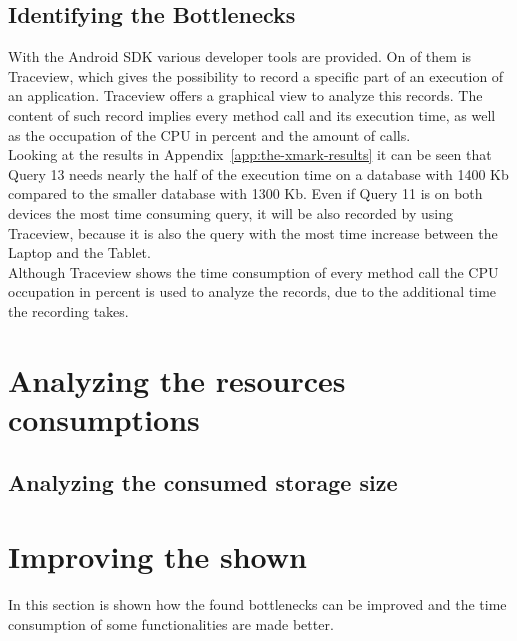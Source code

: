 \subsection{Identifying the Bottlenecks}
\label{sec:identifying-the-bottlenecks}
With the Android SDK various developer tools are provided.
On of them is Traceview, which gives the possibility to record a specific part of an execution of an application.
Traceview offers a graphical view to analyze this records.
The content of such record implies every method call and its execution time, as well as the occupation of the CPU in percent and the amount of calls.\\
Looking at the results in Appendix~\ref{app:the-xmark-results} it can be seen that Query 13 needs nearly the half of the execution time on a database with 1400 Kb compared to the smaller database with 1300 Kb.
Even if Query 11 is on both devices the most time consuming query, it will be also recorded by using Traceview, because it is also the query with the most time increase between the Laptop and the Tablet.
\\
Although Traceview shows the time consumption of every method call the CPU occupation in percent is used to analyze the records, due to the additional time the recording takes.











\section{Analyzing the resources consumptions}
\label{sec:analysis:analyszing-the-resource-consumption}
\subsection{Analyzing the consumed storage size}
\label{sec:analysis:analyzing-the-consumed-storage-size}
\section{Improving the shown }
\label{sec:improving}
In this section is shown how the found bottlenecks can be improved and the time consumption of some functionalities are made better.
